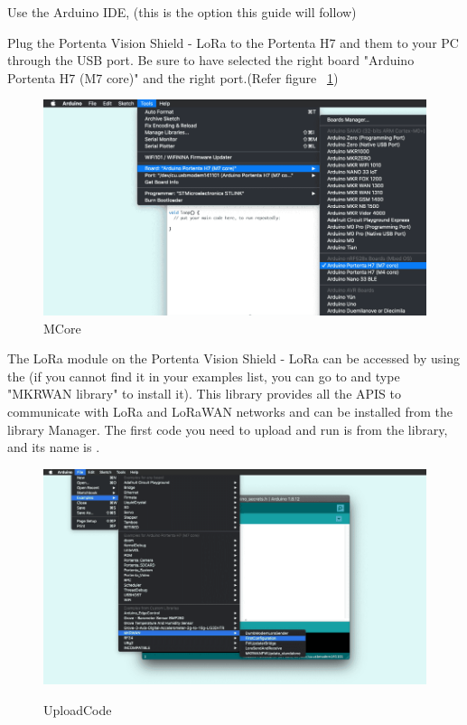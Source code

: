 \begin{itemize}
	Use the Arduino IDE, (this is the option this guide will follow)
	
	Plug the Portenta Vision Shield - LoRa to the Portenta H7 and them to your PC through the USB port. Be sure to have selected the right board "Arduino Portenta H7 (M7 core)" and the right port.(Refer figure ~\ref{MCore}) \cite{ArduinoTTN:2024}
	
	\begin{figure}
		\begin{center}
			\includegraphics[width=0.7\linewidth]{Images/LORA/MCore.png}
			\caption{MCore}
			\label{MCore}
		\end{center}
	\end{figure}
	
	The LoRa module on the Portenta Vision Shield - LoRa can be accessed by using the (if you cannot find it in your examples list, you can go to  and type "MKRWAN library" to install it). This library provides all the APIS to communicate with LoRa and LoRaWAN networks and can be installed from the library Manager. The first code you need to upload and run is from the  library, and its name is . 
	
	\begin{figure}
		\begin{center}
			\includegraphics[width=0.7\linewidth]{Images/LORA/UploadCode.png}
			\caption{UploadCode}
			\label{UploadCode} \cite{ArduinoTTN:2024}
		\end{center}
	\end{figure}
	

\end{itemize}
